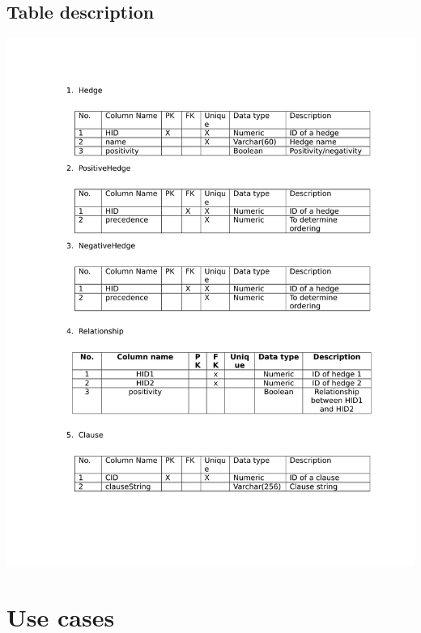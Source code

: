 \documentclass[26pt,fleqn,]{article}
\begin{document}
\subsection{Table description}
\includegraphics[clip=true, trim = 90 0 0 0, scale=0.8, page=1]{DataModel}

\section{Use cases}
\end{document}

